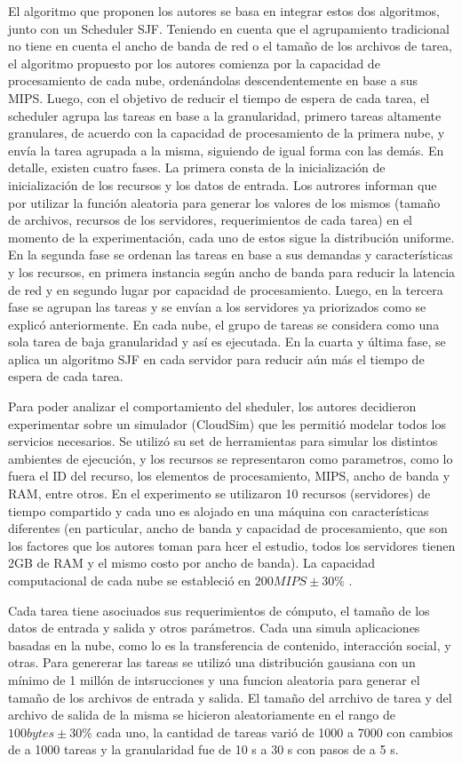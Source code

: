 El algoritmo que proponen los autores se basa en integrar estos dos algoritmos, junto con un Scheduler SJF. Teniendo en cuenta que el agrupamiento tradicional no tiene en cuenta el ancho de banda de red o el tamaño de los archivos de tarea, el algoritmo propuesto por los autores comienza por la capacidad de procesamiento de cada nube, ordenándolas descendentemente en base a sus MIPS. Luego, con el objetivo de reducir el tiempo de espera de cada tarea, el scheduler agrupa las tareas en base a la granularidad, primero tareas altamente granulares, de acuerdo con la capacidad de procesamiento de la primera nube, y envía la tarea agrupada a la misma, siguiendo de igual forma con las demás.	
En detalle, existen cuatro fases. La primera consta de la inicialización de inicialización de los recursos y los datos de entrada. Los autrores informan que por utilizar la función aleatoria para generar los valores de los mismos (tamaño de archivos, recursos de los servidores, requerimientos de cada tarea) en el momento de la experimentación, cada uno de estos sigue la distribución uniforme. En la segunda fase se ordenan las tareas en base a sus demandas y características y los recursos, en primera instancia según ancho de banda para reducir la latencia de red y en segundo lugar por capacidad de procesamiento. Luego, en la tercera fase se agrupan las tareas y se envían a los servidores ya priorizados como se explicó anteriormente. En cada nube, el grupo de tareas se considera como una sola tarea de baja granularidad y así es ejecutada. En la cuarta y última fase, se aplica un algoritmo SJF en cada servidor para reducir aún más el tiempo de espera de cada tarea.

Para poder analizar el comportamiento del sheduler, los autores decidieron experimentar sobre un simulador (CloudSim) que les permitió modelar todos los servicios necesarios. Se utilizó su set de herramientas para simular los distintos ambientes de ejecución, y los recursos se representaron como parametros, como lo fuera el ID del recurso, los elementos de procesamiento, MIPS,  ancho de banda y RAM, entre otros. 
En el experimento se utilizaron 10 recursos (servidores) de tiempo compartido y cada uno es alojado en una máquina con características diferentes (en particular, ancho de banda y capacidad de procesamiento, que son los factores que los autores toman para hcer el estudio, todos los servidores tienen 2GB de RAM y el mismo costo por ancho de banda). La capacidad computacional de cada nube se estableció en $200 MIPS \pm 30\%$ .

Cada tarea tiene asociuados sus requerimientos de cómputo, el tamaño de los datos de entrada y salida y otros parámetros. Cada una simula aplicaciones basadas en la nube, como lo es la transferencia de contenido, interacción social, y otras. Para genererar las tareas se utilizó una distribución gausiana con un mínimo de 1 millón de intsrucciones y una funcion aleatoria para generar el tamaño de los archivos de entrada y salida. El tamaño del arrchivo de tarea y del archivo de salida de la misma se hicieron aleatoriamente en el rango de $100 bytes \pm 30\%$  cada uno, la cantidad de tareas varió de 1000 a 7000 con cambios de a 1000 tareas y la granularidad fue de 10 s a 30 s con pasos de a 5 s.